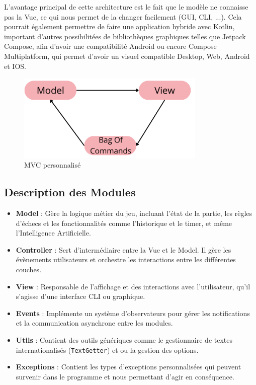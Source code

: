 \documentclass{article}
\begin{document}
L'avantage principal de cette architecture est le fait que le modèle ne connaisse pas la Vue, ce qui nous permet de la changer facilement (GUI, CLI, ...).
Cela pourrait également permettre de faire une application hybride avec Kotlin, important d'autres possibilitées de bibliothèques graphiques telles que Jetpack Compose,
afin d'avoir une compatibilité Android ou encore Compose Multiplatform, qui permet d'avoir un visuel compatible Desktop, Web, Android et IOS.


\begin{figure}[h]
    \centering
    \includegraphics[width=0.8\textwidth]{MVC}
    \caption{MVC personnalisé}
    \label{MVC}
\end{figure}
\FloatBarrier

\subsection{Description des Modules}

\begin{itemize}
    \item \textbf{Model} : Gère la logique métier du jeu, incluant l'état de la partie, les règles d'échecs et les fonctionnalités comme l'historique et le timer, et même l'Intelligence Artificielle.
    \item \textbf{Controller} : Sert d'intermédiaire entre la Vue et le Model. Il gère les évènements utilisateurs et orchestre les interactions entre les différentes couches.
    \item \textbf{View} : Responsable de l'affichage et des interactions avec l'utilisateur, qu'il s'agisse d'une interface CLI ou graphique.
    \item \textbf{Events} : Implémente un système d'observateurs pour gérer les notifications et la communication asynchrone entre les modules.
    \item \textbf{Utils} : Contient des outils génériques comme le gestionnaire de textes internationalisés (\texttt{TextGetter}) et ou la gestion des options.
    \item \textbf{Exceptions} : Contient les types d'exceptions personnalisées qui peuvent survenir dans le programme et nous permettant d'agir en conséquence.
\end{itemize}
\end{document}
